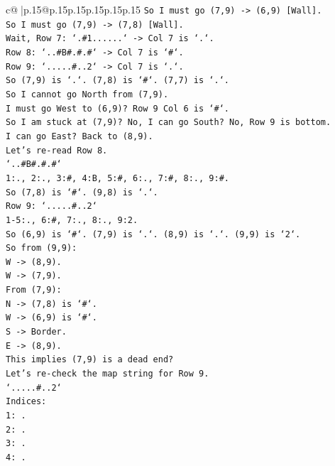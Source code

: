 \documentclass{article}
\begin{document}
{\begin{supertabular}{c@{$\;$}|p{.15\linewidth}@{}p{.15\linewidth}p{.15\linewidth}p{.15\linewidth}p{.15\linewidth}p{.15\linewidth}}
{{{\texttt{So I must go (7,9) {-}> (6,9) {[}Wall{]}.} \\
\texttt{So I must go (7,9) {-}> (7,8) {[}Wall{]}.} \\
\texttt{Wait, Row 7: `.\#1......` {-}> Col 7 is `.`.} \\
\texttt{Row 8: `..\#B\#.\#.\#` {-}> Col 7 is `\#`.} \\
\texttt{Row 9: `.....\#..2` {-}> Col 7 is `.`.} \\
\texttt{So (7,9) is `.`. (7,8) is `\#`. (7,7) is `.`.} \\
\texttt{So I cannot go North from (7,9).} \\
\texttt{I must go West to (6,9)? Row 9 Col 6 is `\#`.} \\
\texttt{So I am stuck at (7,9)? No, I can go South? No, Row 9 is bottom.} \\
\texttt{I can go East? Back to (8,9).} \\
\texttt{Let's re{-}read Row 8.} \\
\texttt{`..\#B\#.\#.\#`} \\
\texttt{1:., 2:., 3:\#, 4:B, 5:\#, 6:., 7:\#, 8:., 9:\#.} \\
\texttt{So (7,8) is `\#`. (9,8) is `.`.} \\
\texttt{Row 9: `.....\#..2`} \\
\texttt{1{-}5:., 6:\#, 7:., 8:., 9:2.} \\
\texttt{So (6,9) is `\#`. (7,9) is `.`. (8,9) is `.`. (9,9) is `2`.} \\
\texttt{So from (9,9):} \\
\texttt{W {-}> (8,9).} \\
\texttt{W {-}> (7,9).} \\
\texttt{From (7,9):} \\
\texttt{N {-}> (7,8) is `\#`.} \\
\texttt{W {-}> (6,9) is `\#`.} \\
\texttt{S {-}> Border.} \\
\texttt{E {-}> (8,9).} \\
\texttt{This implies (7,9) is a dead end?} \\
\texttt{Let's re{-}check the map string for Row 9.} \\
\texttt{`.....\#..2`} \\
\texttt{Indices:} \\
\texttt{1: .} \\
\texttt{2: .} \\
\texttt{3: .} \\
\texttt{4: .} \\
}}}
\end{supertabular}}
\end{document}
